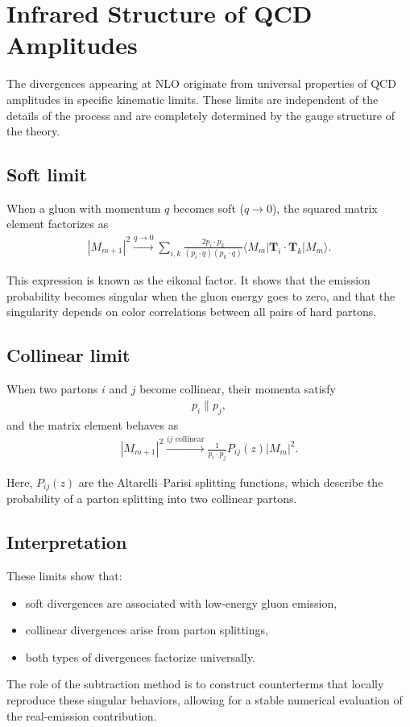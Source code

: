 \section{Infrared Structure of QCD Amplitudes}

The divergences appearing at NLO originate from universal properties
of QCD amplitudes in specific kinematic limits.
These limits are independent of the details of the process and are
completely determined by the gauge structure of the theory.

\subsection{Soft limit}

When a gluon with momentum $q$ becomes soft ($q \to 0$),
the squared matrix element factorizes as
\begin{align}
|M_{m+1}|^2 \xrightarrow{q \to 0}
\sum_{i,k}
\frac{2 p_i \cdot p_k}{(p_i \cdot q)(p_k \cdot q)}
\langle M_m | \mathbf{T}_i \cdot \mathbf{T}_k | M_m \rangle.
\end{align}

This expression is known as the eikonal factor.
It shows that the emission probability becomes singular when the gluon energy
goes to zero, and that the singularity depends on color correlations
between all pairs of hard partons.

\subsection{Collinear limit}

When two partons $i$ and $j$ become collinear,
their momenta satisfy
\begin{align}
p_i \parallel p_j,
\end{align}
and the matrix element behaves as
\begin{align}
|M_{m+1}|^2 \xrightarrow{ij \text{ collinear}}
\frac{1}{p_i \cdot p_j}
P_{ij}(z)
|M_m|^2.
\end{align}

Here, $P_{ij}(z)$ are the Altarelli--Parisi splitting functions,
which describe the probability of a parton splitting into two collinear partons.

\subsection{Interpretation}

These limits show that:
\begin{itemize}
    \item soft divergences are associated with low-energy gluon emission,
    \item collinear divergences arise from parton splittings,
    \item both types of divergences factorize universally.
\end{itemize}

The role of the subtraction method is to construct counterterms
that locally reproduce these singular behaviors, allowing for a stable
numerical evaluation of the real-emission contribution.